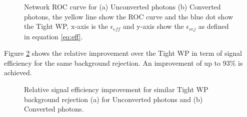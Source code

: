 \begin{figure}[ht]
    \centering
    \caption{Network ROC curve for (a) Unconverted photons (b) Converted photons, the yellow line show the ROC curve and the blue dot show the Tight WP, x-axis is the $\epsilon_{eff}$ and y-axis show the $\epsilon_{rej}$ as defined in equation \ref{eq:eff}.}
    \label{fig:gamma:CNN:Validation:ROC}
\end{figure}
Figure \ref{fig:gamma:CNN:Validation:Imp} shows the relative improvement over the Tight WP in term of signal efficiency for the same background rejection. An improvement of up to 93\% is achieved. 
\begin{figure}[ht]
    \centering
    \caption{Relative signal efficiency improvement for similar Tight WP background rejection (a) for Unconverted photons and (b) Converted photons.}
    \label{fig:gamma:CNN:Validation:Imp}
\end{figure}
